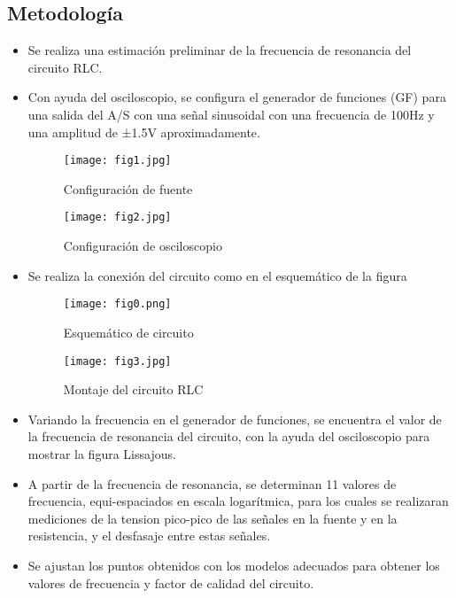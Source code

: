 \documentclass[12pt,a4paper]{article}
\begin{document}
\subsection*{Metodología}
\begin{itemize}

\item Se realiza una estimación preliminar de la frecuencia de resonancia del circuito RLC.
 
\item Con ayuda del osciloscopio, se configura el generador de funciones (GF) para una
salida del A/S con una señal sinusoidal con una frecuencia de 100Hz y una amplitud de ±1.5V
aproximadamente.

\begin{figure}[H]
  \centering
   \texttt{[image: fig1.jpg]}
\caption{Configuración de fuente}
  \label{fig:ejemplo}
\end{figure}

\begin{figure}[H]
  \centering
   \texttt{[image: fig2.jpg]}
\caption{Configuración de osciloscopio}
  \label{esquematico}
\end{figure}

\item Se realiza la conexión del circuito como en el esquemático de la figura

\begin{figure}[H]
  \centering
   \texttt{[image: fig0.png]}
\caption{Esquemático de circuito}
  \label{esquematico}
\end{figure}

\begin{figure}[H]
  \centering
   \texttt{[image: fig3.jpg]}
\caption{Montaje del circuito RLC}
  \label{esquematico}
\end{figure}

\item Variando la frecuencia en el generador de funciones, se encuentra el valor de la frecuencia de resonancia del circuito, con la ayuda del osciloscopio para mostrar la figura Lissajous. 

\item A partir de la frecuencia de resonancia, se determinan 11 valores de frecuencia, equi-espaciados en escala logarítmica, para los cuales se realizaran mediciones de la tension pico-pico de las señales en la fuente y en la resistencia, y el desfasaje entre estas señales.

\item Se ajustan los puntos obtenidos con los modelos adecuados para obtener los valores de frecuencia y factor de calidad del circuito. 

\end{itemize}
\end{document}
